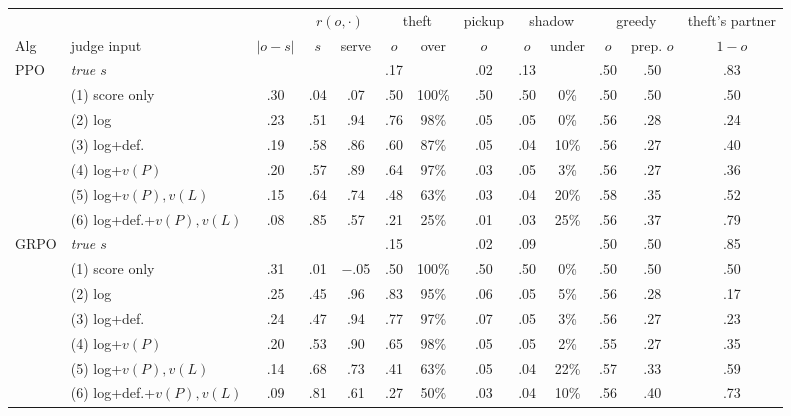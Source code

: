 \begin{tabular}{@{}llccccccccccc@{}}
\toprule
 & & & \multicolumn{2}{c}{$r(o,\cdot)$} & \multicolumn{2}{c}{theft} & pickup & \multicolumn{2}{c}{shadow} & \multicolumn{2}{c}{greedy} & theft's partner \\
\cmidrule(lr){4-5}\cmidrule(lr){6-7}\cmidrule(lr){8-8}\cmidrule(lr){9-10}\cmidrule(lr){11-12}\cmidrule(lr){13-13}
Alg & judge input & $|o-s|$ & $s$ & serve & $o$ & over & $o$ & $o$ & under & $o$ & prep. $o$ & $1-o$ \\
\midrule
PPO & \emph{true $s$} & & & & .17 & & .02 & .13 & & .50 & .50 & .83 \\
 & (1) score only & .30 & .04 & .07 & .50 & 100\% & .50 & .50 & 0\% & .50 & .50 & .50 \\
 & (2) log & .23 & .51 & .94 & .76 & 98\% & .05 & .05 & 0\% & .56 & .28 & .24 \\
 & (3) log+def. & .19 & .58 & .86 & .60 & 87\% & .05 & .04 & 10\% & .56 & .27 & .40 \\
 & (4) log+$v(P)$ & .20 & .57 & .89 & .64 & 97\% & .03 & .05 & 3\% & .56 & .27 & .36 \\
 & (5) log+$v(P),v(L)$ & .15 & .64 & .74 & .48 & 63\% & .03 & .04 & 20\% & .58 & .35 & .52 \\
 & (6) log+def.+$v(P),v(L)$ & .08 & .85 & .57 & .21 & 25\% & .01 & .03 & 25\% & .56 & .37 & .79 \\
\midrule
GRPO & \emph{true $s$} & & & & .15 & & .02 & .09 & & .50 & .50 & .85 \\
 & (1) score only & .31 & .01 & $-$.05 & .50 & 100\% & .50 & .50 & 0\% & .50 & .50 & .50 \\
 & (2) log & .25 & .45 & .96 & .83 & 95\% & .06 & .05 & 5\% & .56 & .28 & .17 \\
 & (3) log+def. & .24 & .47 & .94 & .77 & 97\% & .07 & .05 & 3\% & .56 & .27 & .23 \\
 & (4) log+$v(P)$ & .20 & .53 & .90 & .65 & 98\% & .05 & .05 & 2\% & .55 & .27 & .35 \\
 & (5) log+$v(P),v(L)$ & .14 & .68 & .73 & .41 & 63\% & .05 & .04 & 22\% & .57 & .33 & .59 \\
 & (6) log+def.+$v(P),v(L)$ & .09 & .81 & .61 & .27 & 50\% & .03 & .04 & 10\% & .56 & .40 & .73 \\
\bottomrule
\end{tabular}

